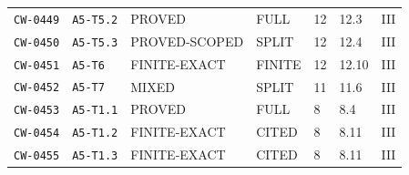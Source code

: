 \begin{center}
\begin{longtable}{@{}lllllll@{}}
\texttt{CW-0449} & \texttt{A5-T5.2} & PROVED & FULL & 12 & 12.3 & III\\
\texttt{CW-0450} & \texttt{A5-T5.3} & PROVED-SCOPED & SPLIT & 12 & 12.4 & III\\
\texttt{CW-0451} & \texttt{A5-T6} & FINITE-EXACT & FINITE & 12 & 12.10 & III\\
\texttt{CW-0452} & \texttt{A5-T7} & MIXED & SPLIT & 11 & 11.6 & III\\
\texttt{CW-0453} & \texttt{A5-T1.1} & PROVED & FULL & 8 & 8.4 & III\\
\texttt{CW-0454} & \texttt{A5-T1.2} & FINITE-EXACT & CITED & 8 & 8.11 & III\\
\texttt{CW-0455} & \texttt{A5-T1.3} & FINITE-EXACT & CITED & 8 & 8.11 & III\\
\bottomrule\end{longtable}
\end{center}
